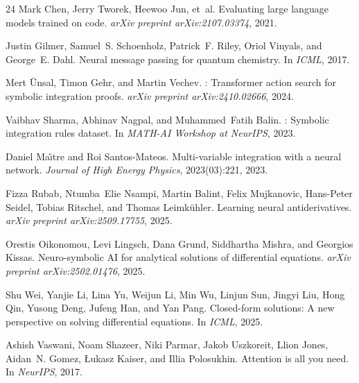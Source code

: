 \documentclass{article}
\begin{document}
\begin{thebibliography}{24}
	Mark Chen, Jerry Tworek, Heewoo Jun, et~al.
	\newblock Evaluating large language models trained on code.
	\newblock \emph{arXiv preprint arXiv:2107.03374}, 2021.

	Justin Gilmer, Samuel~S. Schoenholz, Patrick~F. Riley, Oriol Vinyals, and
	George~E. Dahl.
	\newblock Neural message passing for quantum chemistry.
	\newblock In \emph{ICML}, 2017.

	Mert {\"U}nsal, Timon Gehr, and Martin Vechev.
	: Transformer action search for symbolic
	integration proofs.
	\newblock \emph{arXiv preprint arXiv:2410.02666}, 2024.

	Vaibhav Sharma, Abhinav Nagpal, and Muhammed~Fatih Balin.
	: Symbolic integration rules dataset.
	\newblock In \emph{MATH-AI Workshop at NeurIPS}, 2023.

	Daniel Ma\^{\i}tre and Roi Santos-Mateos.
	\newblock Multi-variable integration with a neural network.
	\newblock \emph{Journal of High Energy Physics}, 2023(03):221, 2023.

	Fizza Rubab, Ntumba~Elie Nsampi, Martin Balint, Felix Mujkanovic,
	Hans-Peter Seidel, Tobias Ritschel, and Thomas Leimk{\"u}hler.
	\newblock Learning neural antiderivatives.
	\newblock \emph{arXiv preprint arXiv:2509.17755}, 2025.

	Orestis Oikonomou, Levi Lingsch, Dana Grund, Siddhartha Mishra, and
	Georgios Kissas.
	\newblock Neuro-symbolic {AI} for analytical solutions of differential
	equations.
	\newblock \emph{arXiv preprint arXiv:2502.01476}, 2025.

	Shu Wei, Yanjie Li, Lina Yu, Weijun Li, Min Wu, Linjun Sun, Jingyi Liu,
	Hong Qin, Yusong Deng, Jufeng Han, and Yan Pang.
	\newblock Closed-form solutions: A new perspective on solving differential
	equations.
	\newblock In \emph{ICML}, 2025.

	Ashish Vaswani, Noam Shazeer, Niki Parmar, Jakob Uszkoreit, Llion Jones,
	Aidan~N. Gomez, \L{}ukasz Kaiser, and Illia Polosukhin.
	\newblock Attention is all you need.
	\newblock In \emph{NeurIPS}, 2017.


\end{thebibliography}
\end{document}
